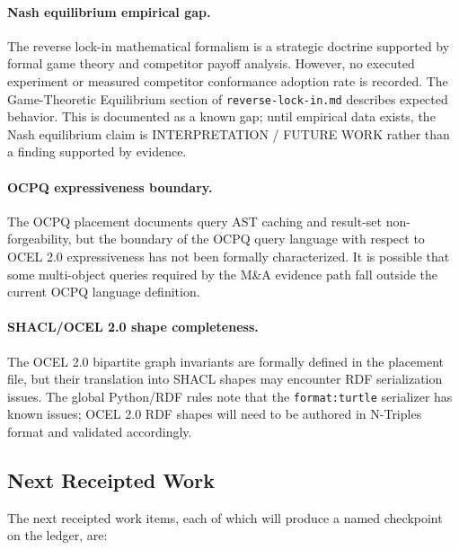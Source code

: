 \paragraph{Nash equilibrium empirical gap.}
The reverse lock-in mathematical formalism is a strategic doctrine supported by formal
game theory and competitor payoff analysis. However, no executed experiment or measured
competitor conformance adoption rate is recorded. The Game-Theoretic Equilibrium section
of \texttt{reverse-lock-in.md} describes expected behavior. This is documented as a known
gap; until empirical data exists, the Nash equilibrium claim is INTERPRETATION / FUTURE
WORK rather than a finding supported by evidence.

\paragraph{OCPQ expressiveness boundary.}
The OCPQ placement documents query AST caching and result-set non-forgeability, but the
boundary of the OCPQ query language with respect to OCEL 2.0 expressiveness has not been
formally characterized. It is possible that some multi-object queries required by the
M\&A evidence path fall outside the current OCPQ language definition.

\paragraph{SHACL/OCEL 2.0 shape completeness.}
The OCEL 2.0 bipartite graph invariants are formally defined in the placement file, but
their translation into SHACL shapes may encounter RDF serialization issues. The global
Python/RDF rules note that the \texttt{format:turtle} serializer has known issues; OCEL
2.0 RDF shapes will need to be authored in N-Triples format and validated accordingly.

\subsection{Next Receipted Work}
\label{sec:standards-open-next}

The next receipted work items, each of which will produce a named checkpoint on the ledger,
are:

